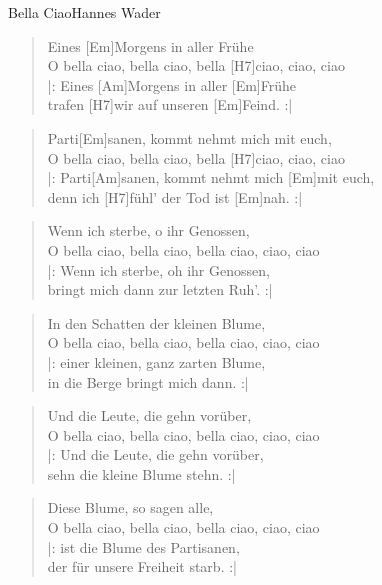 \begin{song}{Bella Ciao}{Hannes Wader}

    \begin{verse}  
        Eines [Em]Morgens in aller Frühe \\
        O bella ciao, bella ciao, bella [H7]ciao, ciao, ciao \\
        |: Eines [Am]Morgens in aller [Em]Frühe \\
        trafen [H7]wir auf unseren [Em]Feind. :|         
    \end{verse}  

    \begin{verse}
        Parti[Em]sanen, kommt nehmt mich mit euch, \\
        O bella ciao, bella ciao, bella [H7]ciao, ciao, ciao \\
        |: Parti[Am]sanen, kommt nehmt mich [Em]mit euch, \\
        denn ich [H7]fühl' der Tod ist [Em]nah. :| 
    \end{verse}

    \begin{verse}  
        Wenn ich sterbe, o ihr Genossen, \\
        O bella ciao, bella ciao, bella ciao, ciao, ciao \\
        |: Wenn ich sterbe, oh ihr Genossen,\\
        bringt mich dann zur letzten Ruh'. :|
    \end{verse}  

    \begin{verse}  
        In den Schatten der kleinen Blume, \\
        O bella ciao, bella ciao, bella ciao, ciao, ciao \\
        |: einer kleinen, ganz zarten Blume, \\
        in die Berge bringt mich dann. :| 
    \end{verse}  

    \begin{verse}  
        Und die Leute, die gehn vorüber, \\
        O bella ciao, bella ciao, bella ciao, ciao, ciao \\
        |: Und die Leute, die gehn vorüber, \\
        sehn die kleine Blume stehn. :|
    \end{verse}  

    \begin{verse}  
        Diese Blume, so sagen alle, \\
        O bella ciao, bella ciao, bella ciao, ciao, ciao \\
        |: ist die Blume des Partisanen, \\
        der für unsere Freiheit starb. :| 
    \end{verse}  

\end{song}
